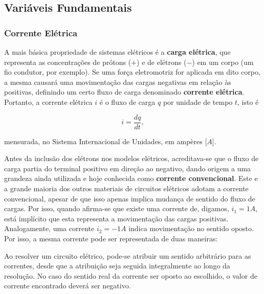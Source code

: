 \documentclass{article}
\numberwithin{equation}{section}
\let\dfr\dfrac
\begin{document}
\subsection{Variáveis Fundamentais}
\label{subsec:variaveis}

\subsubsection{Corrente Elétrica}
\label{subsubsec:corrente}

A mais básica propriedade de sistemas elétricos é a \textbf{carga elétrica}, que representa as concentrações de prótons ($+$) e de elétrons ($-$) em um corpo (um fio condutor, por exemplo). Se uma força eletromotriz for aplicada em dito corpo, a mesma causará uma movimentação das cargas negativas em relação às positivas, definindo um certo fluxo de carga denominado \textbf{corrente elétrica}. Portanto, a corrente elétrica $i$ é o fluxo de carga $q$ por unidade de tempo $t$, isto é

\begin{equation}
    i = \dfr{dq}{dt},
\end{equation}

\noindent mensurada, no Sistema Internacional de Unidades, em ampères [$A$].

Antes da inclusão dos elétrons nos modelos elétricos, acreditava-se que o fluxo de carga partia do terminal positivo em direção ao negativo, dando origem a uma grandeza ainda utilizada e hoje conhecida como \textbf{corrente convencional}. Este e a grande maioria dos outros materiais de circuitos elétricos adotam a corrente convencional, apesar de que isso apenas implica mudança de sentido do fluxo de cargas. Por isso, quando afirma-se que existe uma corrente de, digamos, $i_1=1A$, está implícito que esta representa a movimentação das cargas positivas. Analogamente, uma corrente $i_2=-1A$ indica movimentação no sentido oposto. Por isso, a mesma corrente pode ser representada de duas maneiras:

\begin{center}
\end{center}

Ao resolver um circuito elétrico, pode-se atribuir um sentido arbitrário para as correntes, desde que a atribuição seja seguida integralmente ao longo da resolução. No caso do sentido real da corrente ser oposto ao escolhido, o valor de corrente encontrado deverá ser negativo.
\end{document}
